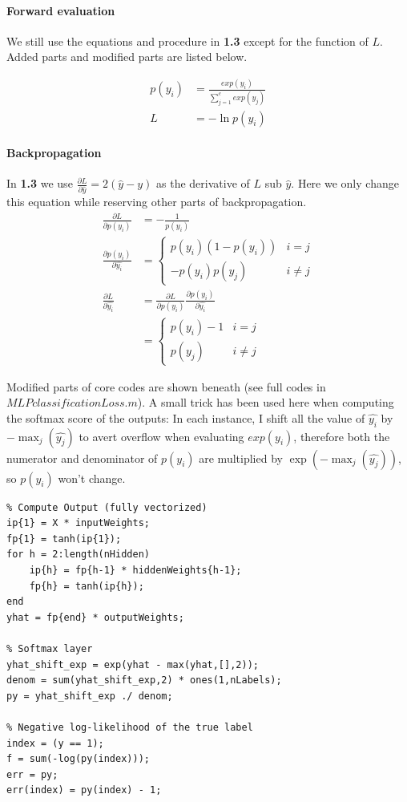 \documentclass{article}
\begin{document}
\paragraph{Forward evaluation}
We still use the equations and procedure in \textbf{1.3} except for the function of $L$. Added parts and modified parts are listed below.

\[
\begin{aligned}
p(y_i)&=\frac{exp(y_i)}{\sum_{j=1}^cexp(y_j)}\\
L&=-\ln p(y_i)
\end{aligned}
\]

\paragraph{Backpropagation}
In \textbf{1.3} we use $\frac{\partial L}{\partial \hat{y}}=2(\hat{y}-y)$ as the derivative of $L$ sub $\hat{y}$. Here we only change this equation while reserving other parts of backpropagation. 
\[
\begin{aligned}
\frac{\partial L}{\partial p(y_i)}&=-\frac{1}{p(y_i)}\\
\frac{\partial p(y_i)}{\partial \hat{y_i}}&=
\begin{cases}
p(y_i)(1-p(y_i))& i=j\\
-p(y_i)p(y_j) & i\neq j
\end{cases}
\\
\frac{\partial L}{\partial \hat{y_i}}&=\frac{\partial L}{\partial p(y_i)}\frac{\partial p(y_i)}{\partial \hat{y_i}}\\
&=
\begin{cases}
p(y_i)-1& i=j\\
p(y_j) & i\neq j
\end{cases}
\end{aligned}
\]

Modified parts of core codes are shown beneath (see full codes in $MLPclassificationLoss.m$). A small trick has been used here when computing the softmax score of the outputs: In each instance, I shift all the value of $\hat{y_i}$ by $-\max_j(\hat{y_j})$ to avert overflow when evaluating $exp(y_i)$, therefore both the numerator and denominator of $p(y_i)$ are multiplied by $\exp(-\max_j(\hat{y_j}))$, so $p(y_i)$ won't change.

\begin{lstlisting}
% Compute Output (fully vectorized)
ip{1} = X * inputWeights;
fp{1} = tanh(ip{1});
for h = 2:length(nHidden)
    ip{h} = fp{h-1} * hiddenWeights{h-1};
    fp{h} = tanh(ip{h});
end
yhat = fp{end} * outputWeights;

% Softmax layer
yhat_shift_exp = exp(yhat - max(yhat,[],2));
denom = sum(yhat_shift_exp,2) * ones(1,nLabels);
py = yhat_shift_exp ./ denom;

% Negative log-likelihood of the true label
index = (y == 1);
f = sum(-log(py(index)));
err = py;
err(index) = py(index) - 1;
\end{lstlisting}
\end{document}
